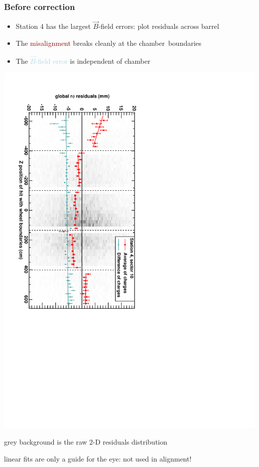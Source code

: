 \documentclass[compress]{beamer}
\begin{document}
\begin{frame}
\frametitle{Before correction}

\begin{itemize}
\item Station 4 has the largest $\vec{B}$-field errors: plot residuals across barrel
\item The \textcolor{darkred}{misalignment} breaks cleanly at the \mbox{chamber boundaries\hspace{-1 cm}}
\item The \textcolor{lightblue}{$\vec{B}$-field error} is independent of chamber
\end{itemize}

\includegraphics[height=\linewidth, angle=90]{demo_of_bfield.pdf}

\scriptsize grey background is the raw 2-D residuals distribution

linear fits are only a guide for the eye: not used in alignment!
\end{frame}
\end{document}
